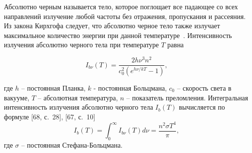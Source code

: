 Абсолютно черным называется тело, которое поглощает все падающее
со всех направлений излучение любой частоты без отражения, пропускания и
рассеяния.
Из закона Кирхгофа следует, что абсолютно черное тело также излучает
максимальное количество энергии при данной
температуре~\cite[25]{Ozisik1976}\cite[5]{modest2013radiative}.
Интенсивность излучения абсолютно черного тела при температуре $T$ равна

\[
    I_{b\nu}(T) = \frac{2h \nu^3 n^2}{c^2_0(e^{h\nu/kT} - 1)},
\]

где $h$ -- постоянная Планка, $k$ - постоянная Больцмана, $c_0$ -- скорость света в вакууме,
$T$ -- абсолютная температура, $n$ -- показатель преломления.
Интегральная интенсивность излучения абсолютно черного тела $I_b(T)$
вычисляется по формуле [68, с.\ 28], [67, с.\ 10]
\[
    I_b(T) = \int^{\infty}_0 I_{b\nu}(T) d\nu = \frac{n^2 \sigma T^4}{\pi},
\]
где $\sigma$ -- постоянная Стефана-Больцмана.


